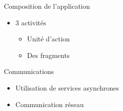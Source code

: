 \documentclass{beamer} %
\begin{document}
  \begin{frame}{\subsecname}
    \begin{block}{Composition de l'application}
      \begin{itemize}
        \item 3 activités
        \begin{itemize}
          \item Unité d'action
          \item Des fragments
        \end{itemize}
      \end{itemize}
    \end{block}

    \begin{block}{Communications}
      \begin{itemize}
        \item Utilisation de services asynchrones
        \item Communication réseau
      \end{itemize}
    \end{block}
    
  \end{frame}
\end{document}
